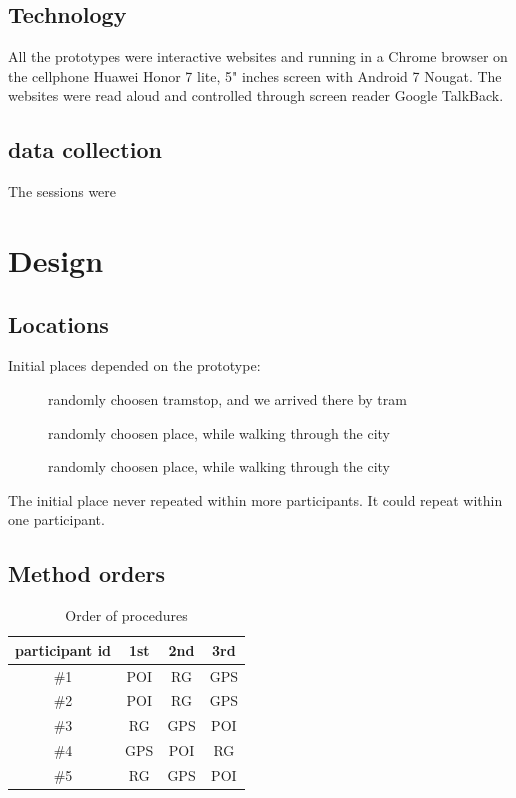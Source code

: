 \documentclass[11pt,oneside,a4paper]{book}
\begin{document}
	\subsection{Technology}
	All the prototypes were interactive websites and running in a Chrome browser on the cellphone Huawei Honor 7 lite, 5" inches screen with Android 7 Nougat. The websites were read aloud and controlled through screen reader Google TalkBack\cite{later}.
	\subsection{data collection}
	The sessions were
	
	\section{Design}
	\subsection{Locations}
	Initial places depended on the prototype:
	\begin{description}
		\item [\poi{}] randomly choosen tramstop, and we arrived there by tram
		\item [\reversegeo{}] randomly choosen place, while walking through the city
		\item [\gps{}] randomly choosen place, while walking through the city
	\end{description}
	
	The initial place never repeated within more participants. It could repeat within one participant.
	\subsection{Method orders}
	\begin{table}[]
		\centering
		\caption{Order of procedures}
		\label{my-label}
		\begin{tabular}{@{}cccc@{}}
			\toprule
			\textbf{participant id} & \textbf{1st} & \textbf{2nd} & \textbf{3rd} \\ \midrule
			\#1                     & POI          & RG           & GPS          \\
			\#2                     & POI          & RG           & GPS          \\
			\#3                     & RG           & GPS          & POI          \\
			\#4                     & GPS          & POI          & RG           \\
			\#5                     & RG           & GPS          & POI          \\ \bottomrule
		\end{tabular}
	\end{table}
	
\end{document}
